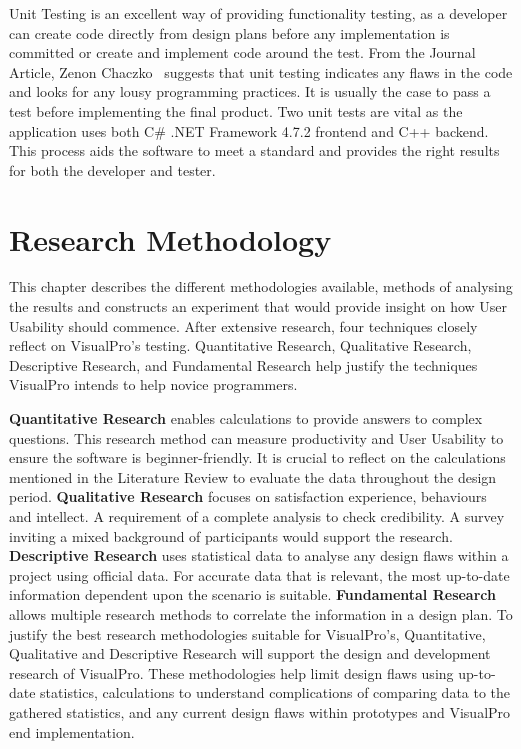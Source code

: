 \documentclass[12pt]{report} %
\begin{document}
		Unit Testing is an excellent way of providing functionality testing, as a developer can create code directly from design plans before any implementation is committed or create and implement code around the test. From the Journal Article, Zenon Chaczko~\cite{chaczko_design_2014} suggests that unit testing indicates any flaws in the code and looks for any lousy programming practices. It is usually the case to pass a test before implementing the final product. Two unit tests are vital as the application uses both C\# .NET Framework 4.7.2 frontend and C++ backend. This process aids the software to meet a standard and provides the right results for both the developer and tester.
		
\chapter{Research Methodology}
\label{chap:researchMethodology}
	This chapter describes the different methodologies available, methods of analysing the results and constructs an experiment that would provide insight on how User Usability should commence. After extensive research, four techniques closely reflect on VisualPro's testing. Quantitative Research, Qualitative Research, Descriptive Research, and Fundamental Research help justify the techniques VisualPro intends to help novice programmers.

	\textbf{Quantitative Research} enables calculations to provide answers to complex questions. This research method can measure productivity and User Usability to ensure the software is beginner-friendly. It is crucial to reflect on the calculations mentioned in the Literature Review to evaluate the data throughout the design period. \textbf{Qualitative Research} focuses on satisfaction experience, behaviours and intellect. A requirement of a complete analysis to check credibility. A survey inviting a mixed background of participants would support the research. \textbf{Descriptive Research} uses statistical data to analyse any design flaws within a project using official data. For accurate data that is relevant, the most up-to-date information dependent upon the scenario is suitable. \textbf{Fundamental Research} allows multiple research methods to correlate the information in a design plan. To justify the best research methodologies suitable for VisualPro's, Quantitative, Qualitative and Descriptive Research will support the design and development research of VisualPro. These methodologies help limit design flaws using up-to-date statistics, calculations to understand complications of comparing data to the gathered statistics, and any current design flaws within prototypes and VisualPro end implementation.
\end{document}
